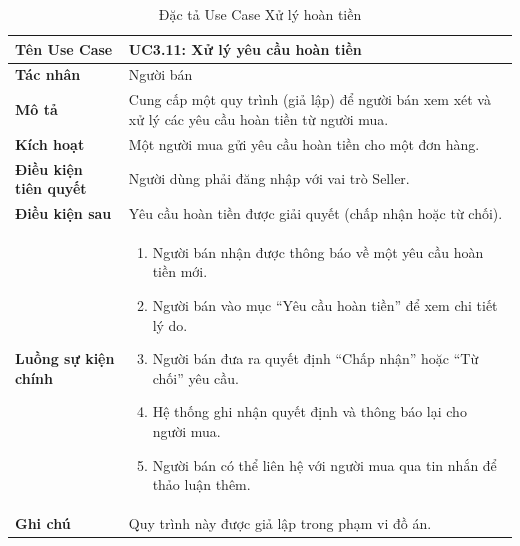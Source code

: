 \begin{table}[H]
\centering
\begin{tabularx}{\textwidth}{|l|X|}
\hline
\textbf{Tên Use Case} & \textbf{UC3.11: Xử lý yêu cầu hoàn tiền} \\ \hline
\textbf{Tác nhân} & Người bán \\ \hline
\textbf{Mô tả} & Cung cấp một quy trình (giả lập) để người bán xem xét và xử lý các yêu cầu hoàn tiền từ người mua. \\ \hline
\textbf{Kích hoạt} & Một người mua gửi yêu cầu hoàn tiền cho một đơn hàng. \\ \hline
\textbf{Điều kiện tiên quyết} & Người dùng phải đăng nhập với vai trò Seller. \\ \hline
\textbf{Điều kiện sau} & Yêu cầu hoàn tiền được giải quyết (chấp nhận hoặc từ chối). \\ \hline
\textbf{Luồng sự kiện chính} & 
\begin{enumerate}
    \item Người bán nhận được thông báo về một yêu cầu hoàn tiền mới.
    \item Người bán vào mục ``Yêu cầu hoàn tiền'' để xem chi tiết lý do.
    \item Người bán đưa ra quyết định ``Chấp nhận'' hoặc ``Từ chối'' yêu cầu.
    \item Hệ thống ghi nhận quyết định và thông báo lại cho người mua.
    \item Người bán có thể liên hệ với người mua qua tin nhắn để thảo luận thêm.
\end{enumerate} \\ \hline
\textbf{Ghi chú} & Quy trình này được giả lập trong phạm vi đồ án. \\ \hline
\end{tabularx}
\caption{Đặc tả Use Case Xử lý hoàn tiền}
\end{table}

